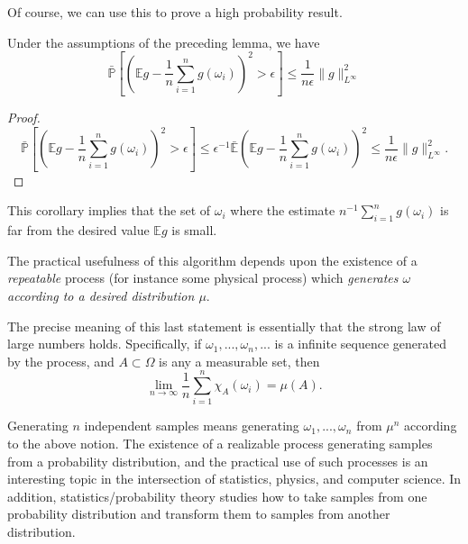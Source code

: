 
Of course, we can use this to prove a high probability result.
\begin{corollary}
 Under the assumptions of the preceding lemma, we have
 \begin{equation}
\mathbb{\bar P}\left [(\mathbb{E}g-\frac1n\sum_{i=1}^n
    g(\omega_i))^2 >\epsilon\right ] 
\le  \frac{1}{n\epsilon}\|g\|^2_{L^\infty}
 \end{equation}
\end{corollary}
\begin{proof}
 \begin{equation}
  \mathbb{\bar P}\left [(\mathbb{E}g-\frac1n\sum_{i=1}^n
    g(\omega_i))^2 >\epsilon\right ] 
\le \epsilon^{-1}
    \mathbb{\bar E}(\mathbb{E}g-\frac1n\sum_{i=1}^n
    g(\omega_i))^2
\le \frac{1}{n\epsilon}\|g\|^2_{L^\infty}. 
 \end{equation}
 
\end{proof}

This corollary implies that the set of $\omega_i$ where the estimate
$n^{-1}\sum_{i=1}^n g(\omega_i)$ is far from the desired value $\mathbb{E}g$
is small.

The practical usefulness of this algorithm depends upon the existence
of a \textit{repeatable} process (for instance some physical process)
which \textit{generates $\omega$ according to a desired distribution
  $\mu$}.

The precise meaning of this last statement is essentially that the
strong law of large numbers holds. Specifically, if
$\omega_1,...,\omega_n,...$ is a infinite sequence generated by the
process, and $A\subset \Omega$ is any a measurable set, then
\begin{equation}
 \lim_{n\rightarrow\infty} \frac{1}{n}\displaystyle\sum_{i=1}^n\chi_A(\omega_i) = \mu(A).
\end{equation}

Generating $n$ independent samples means generating
$\omega_1,...,\omega_n$ from $\mu^n$ according to the above notion.
The existence of a realizable process generating samples from a
probability distribution, and the practical use of such processes is
an interesting topic in the intersection of statistics, physics, and
computer science. In addition, statistics/probability theory studies
how to take samples from one probability distribution and transform
them to samples from another distribution.
